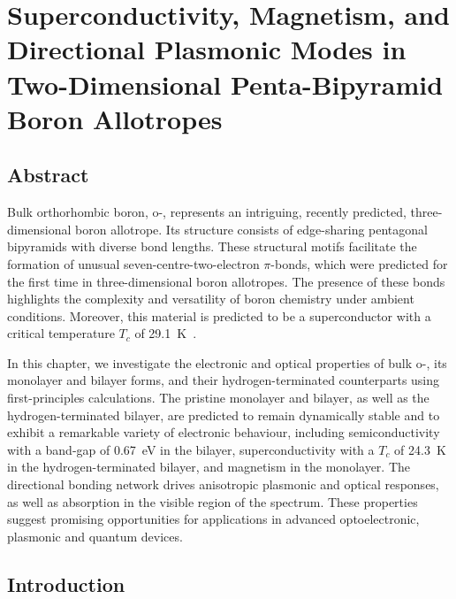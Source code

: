 \chapter[Functional Properties of Penta-Bipyramid Boron Phases]{Superconductivity, Magnetism, and Directional Plasmonic Modes in Two-Dimensional Penta-Bipyramid Boron Allotropes}
\label{cha:project_boron}

\section{Abstract}
\label{2_abstract}

Bulk orthorhombic boron, o-, represents an intriguing, recently predicted,
three-dimensional boron allotrope.
Its structure consists of edge-sharing pentagonal bipyramids
with diverse bond lengths.
These structural motifs facilitate the formation of unusual seven-centre-two-electron $\pi$-bonds,
which were predicted for the first time in three-dimensional boron allotropes.
The presence of these bonds highlights the complexity and versatility of boron chemistry under ambient conditions.
Moreover, this material is predicted to be a superconductor with a critical temperature $T_c$ of \qty{29.1}{K}~\cite{han2023superconducting}.

In this chapter, we investigate the electronic and optical properties of bulk o-,
its monolayer and bilayer forms,
and their hydrogen-terminated counterparts using first-principles calculations.
The pristine monolayer and bilayer, as well as the hydrogen-terminated bilayer,
are predicted to remain dynamically stable and to exhibit a remarkable variety of electronic behaviour,
including semiconductivity with a band-gap of \qty{0.67}{\electronvolt} in the bilayer,
superconductivity with a $T_c$ of \qty{24.3}{K} in the hydrogen-terminated bilayer,
and magnetism in the monolayer.
The directional bonding network drives anisotropic plasmonic and optical responses,
as well as absorption in the visible region of the spectrum.
These properties suggest promising opportunities for applications in advanced optoelectronic, plasmonic and quantum devices.

\clearpage
\section{Introduction}
\label{2_introduction}

